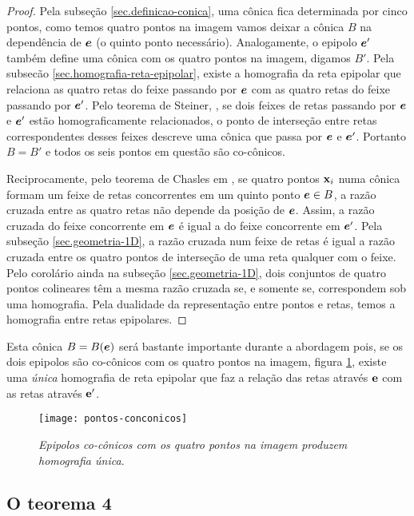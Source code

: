 \begin{proof}


Pela subseção \ref{sec.definicao-conica}, uma cônica fica determinada por cinco pontos, como temos quatro pontos na imagem vamos deixar a cônica $B$ na dependência de $\boldsymbol{e}$ (o quinto ponto necessário). Analogamente, o epipolo $\boldsymbol{e}'$ também define uma cônica com os quatro pontos na imagem, digamos $B'$. Pela subsec\~ao \ref{sec.homografia-reta-epipolar}, existe a homografia da reta epipolar que relaciona as quatro retas do feixe passando por $\boldsymbol{e}$ com as quatro retas do feixe passando por $\boldsymbol{e}'$. Pelo teorema de Steiner, \citep{kneebone}, se dois feixes de retas passando por $\boldsymbol{e}$ e $\boldsymbol{e}'$ estão homograficamente relacionados, o ponto de interseção entre retas correspondentes desses feixes descreve uma cônica que passa por $\boldsymbol{e}$ e $\boldsymbol{e}'$. Portanto $B=B'$ e todos os seis pontos em questão são co-cônicos.


Reciprocamente, pelo teorema de Chasles em \citep{kneebone}, se quatro pontos $\mathbf{x}_i$ numa cônica formam um feixe de retas concorrentes em um quinto ponto $\boldsymbol{e}\in B$, a razão cruzada entre as quatro retas não depende da posição de $\boldsymbol{e}$. Assim, a razão cruzada  do feixe concorrente em $\boldsymbol{e}$ é igual a do feixe concorrente em $\boldsymbol{e}'$. Pela subseção \ref{sec.geometria-1D}, a razão cruzada num feixe de retas é igual a razão cruzada entre os quatro pontos de interseção de uma reta qualquer com o feixe. Pelo corolário ainda na subseção \ref{sec.geometria-1D}, dois conjuntos de quatro pontos colineares têm a mesma razão cruzada se, e somente se, correspondem sob uma homografia.  Pela dualidade da representação entre pontos e retas, temos a homografia entre retas epipolares.  
\end{proof}

Esta cônica $B=B(\boldsymbol{e})$ será bastante importante durante a abordagem pois, se os dois epipolos são co-cônicos com os quatro pontos na imagem, figura \ref{pontos-conconicos}, existe uma \textit{única} homografia de reta epipolar que faz a relação das retas através ${\bf e}$ com as retas através ${\bf e'}$. 

\begin{figure}[!htb]
\centering
\texttt{[image: pontos-conconicos]}
\caption{\textit{Epipolos co-cônicos com os quatro pontos na imagem produzem homografia única.}}
\label{pontos-conconicos}
\end{figure}

\subsection{O teorema 4}\label{sec.demonstracao-teo-4}

